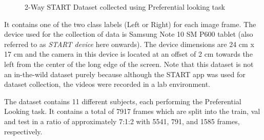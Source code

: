 
\begin{figure}[h]
    \centering
    \captionsetup[subfigure]{justification=centering}
    \quad
    \caption{2-Way START Dataset collected using Preferential looking task}
    \label{fig:2waySTARTdata}
\end{figure}

It contains one of the two class labels (Left or Right) for each image frame. The device used for the collection of data is Samsung Note 10 SM P600 tablet (also referred to as \emph{START device} here onwards). The device dimensions are 24 cm x 17 cm and the camera in this device is located at an offset of 2 cm towards the left from the center of the long edge of the screen. Note that this dataset is not an in-the-wild dataset purely because although the START app was used for dataset collection, the videos were recorded in a lab environment.

The dataset contains 11 different subjects, each performing the Preferential Looking task. It contains a total of 7917 frames which are split into the train, val and test in a ratio of approximately 7:1:2 with 5541, 791, and 1585 frames, respectively.